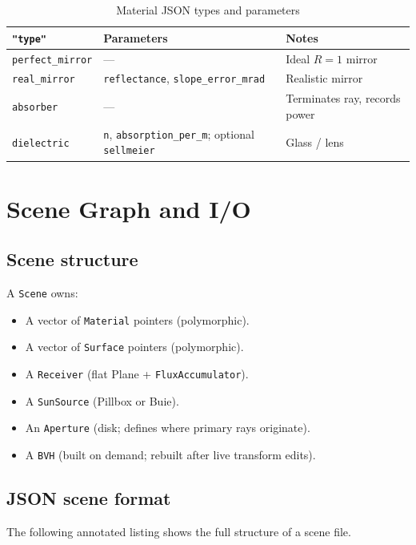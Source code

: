 \documentclass[12pt,a4paper]{report}
\begin{document}
\begin{table}[H]\centering
\caption{Material JSON types and parameters}
\begin{tabular}{llp{6cm}}
\toprule
\texttt{"type"} & Parameters & Notes \\
\midrule
\texttt{perfect\_mirror} & — & Ideal $R=1$ mirror \\
\texttt{real\_mirror} & \texttt{reflectance}, \texttt{slope\_error\_mrad} & Realistic mirror \\
\texttt{absorber} & — & Terminates ray, records power \\
\texttt{dielectric} & \texttt{n}, \texttt{absorption\_per\_m}; optional \texttt{sellmeier} & Glass / lens \\
\bottomrule
\end{tabular}
\end{table}

\chapter{Scene Graph and I/O}

\section{Scene structure}

A \texttt{Scene} owns:
\begin{itemize}
  \item A vector of \texttt{Material} pointers (polymorphic).
  \item A vector of \texttt{Surface} pointers (polymorphic).
  \item A \texttt{Receiver} (flat Plane + \texttt{FluxAccumulator}).
  \item A \texttt{SunSource} (Pillbox or Buie).
  \item An \texttt{Aperture} (disk; defines where primary rays originate).
  \item A \texttt{BVH} (built on demand; rebuilt after live transform edits).
\end{itemize}

\section{JSON scene format}

The following annotated listing shows the full structure of a scene file.
\end{document}
